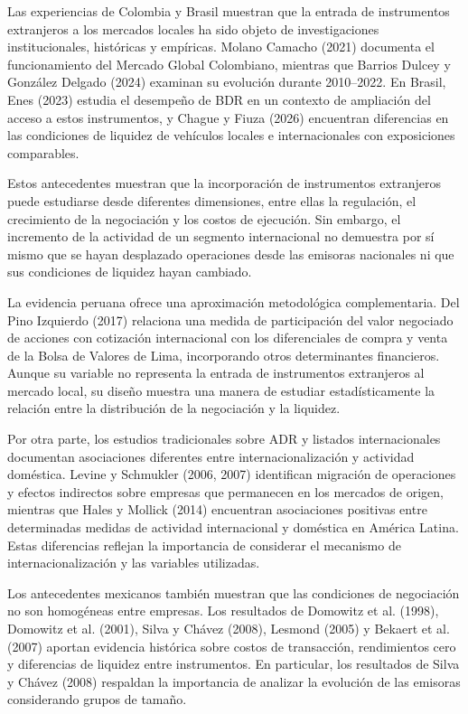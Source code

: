 Las experiencias de Colombia y Brasil muestran que la entrada de instrumentos extranjeros a los mercados locales ha sido objeto de investigaciones institucionales, históricas y empíricas. Molano Camacho (2021) documenta el funcionamiento del Mercado Global Colombiano, mientras que Barrios Dulcey y González Delgado (2024) examinan su evolución durante 2010--2022. En Brasil, Enes (2023) estudia el desempeño de BDR en un contexto de ampliación del acceso a estos instrumentos, y Chague y Fiuza (2026) encuentran diferencias en las condiciones de liquidez de vehículos locales e internacionales con exposiciones comparables.

Estos antecedentes muestran que la incorporación de instrumentos extranjeros puede estudiarse desde diferentes dimensiones, entre ellas la regulación, el crecimiento de la negociación y los costos de ejecución. Sin embargo, el incremento de la actividad de un segmento internacional no demuestra por sí mismo que se hayan desplazado operaciones desde las emisoras nacionales ni que sus condiciones de liquidez hayan cambiado.

La evidencia peruana ofrece una aproximación metodológica complementaria. Del Pino Izquierdo (2017) relaciona una medida de participación del valor negociado de acciones con cotización internacional con los diferenciales de compra y venta de la Bolsa de Valores de Lima, incorporando otros determinantes financieros. Aunque su variable no representa la entrada de instrumentos extranjeros al mercado local, su diseño muestra una manera de estudiar estadísticamente la relación entre la distribución de la negociación y la liquidez.

Por otra parte, los estudios tradicionales sobre ADR y listados internacionales documentan asociaciones diferentes entre internacionalización y actividad doméstica. Levine y Schmukler (2006, 2007) identifican migración de operaciones y efectos indirectos sobre empresas que permanecen en los mercados de origen, mientras que Hales y Mollick (2014) encuentran asociaciones positivas entre determinadas medidas de actividad internacional y doméstica en América Latina. Estas diferencias reflejan la importancia de considerar el mecanismo de internacionalización y las variables utilizadas.

Los antecedentes mexicanos también muestran que las condiciones de negociación no son homogéneas entre empresas. Los resultados de Domowitz et al. (1998), Domowitz et al. (2001), Silva y Chávez (2008), Lesmond (2005) y Bekaert et al. (2007) aportan evidencia histórica sobre costos de transacción, rendimientos cero y diferencias de liquidez entre instrumentos. En particular, los resultados de Silva y Chávez (2008) respaldan la importancia de analizar la evolución de las emisoras considerando grupos de tamaño.

